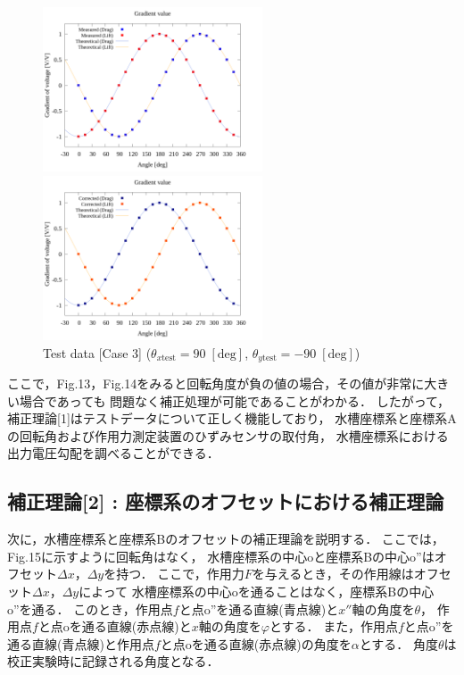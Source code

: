 \begin{figure}[htbp]
  \begin{minipage}[b]{0.45\linewidth}
    \centering
    \includegraphics[width=65mm]{../../02_workspace/result/rotation_tx=90.0_ty=-90.0/plot/20/20_adjust-value.png}
  \end{minipage}
  \begin{minipage}[b]{0.45\linewidth}
    \centering
    \includegraphics[width=65mm]{../../02_workspace/result/rotation_tx=90.0_ty=-90.0/plot/21/21-4_summary.png}
  \end{minipage}
  \caption{Test data [Case 3] ($\theta_{x \mathrm{test}} = 90 \; \mathrm{[deg]}$, $\theta_{y \mathrm{test}} = -90 \; \mathrm{[deg]}$)}
\end{figure}

ここで，Fig.13，Fig.14をみると回転角度が負の値の場合，その値が非常に大きい場合であっても
問題なく補正処理が可能であることがわかる．
したがって，補正理論[1]はテストデータについて正しく機能しており，
水槽座標系と座標系Aの回転角および作用力測定装置のひずみセンサの取付角，
水槽座標系における出力電圧勾配を調べることができる．

\newpage
\subsection{補正理論[2] : 座標系のオフセットにおける補正理論}

次に，水槽座標系と座標系Bのオフセットの補正理論を説明する．
ここでは，Fig.15に示すように回転角はなく，
水槽座標系の中心oと座標系Bの中心o''はオフセット$\Delta x$，$\Delta y$を持つ．
ここで，作用力$F$を与えるとき，その作用線はオフセット$\Delta x$，$\Delta y$によって
水槽座標系の中心oを通ることはなく，座標系Bの中心o''を通る．
このとき，作用点$f$と点o''を通る直線(青点線)と$x''$軸の角度を$\theta$，
作用点$f$と点oを通る直線(赤点線)と$x$軸の角度を$\varphi$とする．
また，作用点$f$と点o''を通る直線(青点線)と作用点$f$と点oを通る直線(赤点線)の角度を$\alpha$とする．
角度$\theta$は校正実験時に記録される角度となる．

